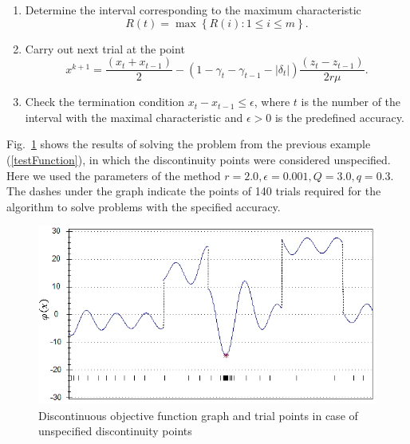 \documentclass[runningheads]{llncs}
\begin{document}
\begin{enumerate}
\item Determine the interval corresponding to the maximum characteristic
\[
R(t)=\max\left\{R(i): 1 \leq i \leq m\right\}.
\]

\item Carry out next trial at the point 
\begin{equation}\label{new_x_2}
x^{k+1}=\frac {(x_t+x_{t-1})}{2}-(1-\gamma_t-\gamma_{t-1}- |\delta_t|) \frac{(z_t-z_{t-1})}{2r\mu}.
\end{equation}

\item Check the termination condition $x_t-x_{t-1} \leq \epsilon$, where $t$ is the number of the interval with the maximal characteristic and $\epsilon > 0$ is the predefined accuracy.
\end{enumerate}

Fig.~\ref{ris2} shows the results of solving the problem from the previous example (\ref{testFunction}), in which the discontinuity points were considered unspecified. Here we used the parameters of the method $r=2.0, \epsilon=0.001, Q=3.0, q=0.3$. The dashes under the graph indicate the points of 140 trials required for the algorithm to solve problems with the specified accuracy.

\begin{figure}%
	\begin{center}
			\includegraphics[width=0.9\linewidth]{ris_2.jpg}
			\caption{Discontinuous objective function graph and trial points in case of unspecified discontinuity points}
      \label{ris2}
	\end{center}
\end{figure}
\end{document}
